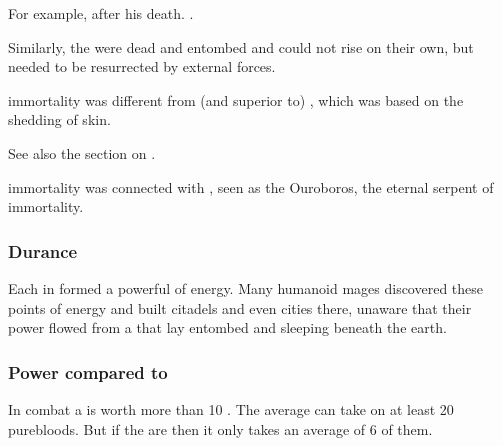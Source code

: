 For example, \Sethicus {} after his death. 
\Nexagglachel {}. 

Similarly, the  were dead and entombed and could not rise on their own, but needed to be resurrected by external forces. 

\Draconic immortality was different from (and superior to) , which was based on the shedding of skin. 

See also the section on . 

\Draconic immortality was connected with \KhothSell, seen as the Ouroboros, the eternal serpent of immortality.





\subsubsection{Durance \nexi}
Each \dragon in  formed a powerful \nexus of energy. 
Many humanoid mages discovered these points of energy and built citadels and even cities there, unaware that their power flowed from a \dragon that lay entombed and sleeping beneath the earth. 





\subsubsection{Power compared to \resphain}
In combat a \dragon is worth more than 10 \resphain. 
The average \dragon can take on at least 20 purebloods. 
But if the \resphain are  then it only takes an average of 6 of them.









